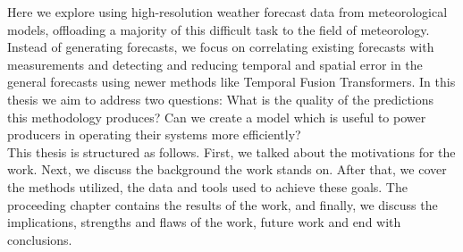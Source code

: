 Here we explore using high-resolution weather forecast data from meteorological models, offloading a majority of this difficult task to the field of meteorology. Instead of generating forecasts, we focus on correlating existing forecasts with measurements and detecting and reducing temporal and spatial error in the general forecasts using newer methods like Temporal Fusion Transformers.
In this thesis we aim to address two questions: What is the quality of the predictions this methodology produces? Can we create a model which is useful to power producers in operating their systems more efficiently?\\


This thesis is structured as follows. First, we talked about the motivations for the work. Next, we discuss the background the work stands on. After that, we cover the methods utilized, the data and tools used to achieve these goals. The proceeding chapter contains the results of the work, and finally, we discuss the implications, strengths and flaws of the work, future work and end with conclusions.







